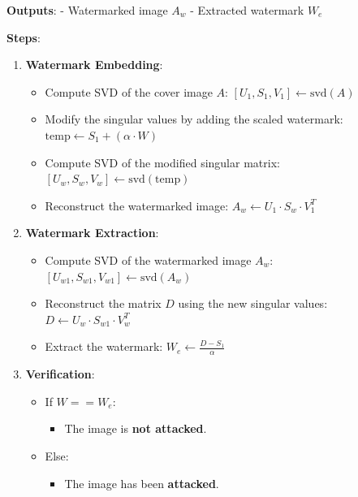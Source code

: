 \documentclass[
  journal,
]{IEEEtran}%
\providecommand{\tightlist}{%
  \setlength{\itemsep}{0pt}\setlength{\parskip}{0pt}}\usepackage{longtable,booktabs,array}
\begin{document}
\textbf{Outputs}: - Watermarked image \(A_w\) - Extracted watermark
\(W_e\)

\textbf{Steps}:

\begin{enumerate}
\def\labelenumi{\arabic{enumi}.}
\tightlist
\item
  \textbf{Watermark Embedding}:

  \begin{itemize}
  \tightlist
  \item
    Compute SVD of the cover image \(A\):
    \([U_1, S_1, V_1] \gets \text{svd}(A)\)
  \item
    Modify the singular values by adding the scaled watermark:
    \(\text{temp} \gets S_1 + (\alpha \cdot W)\)
  \item
    Compute SVD of the modified singular matrix:
    \([U_w, S_w, V_w] \gets \text{svd}(\text{temp})\)
  \item
    Reconstruct the watermarked image:
    \(A_w \gets U_1 \cdot S_w \cdot V_1^T\)
  \end{itemize}
\item
  \textbf{Watermark Extraction}:

  \begin{itemize}
  \tightlist
  \item
    Compute SVD of the watermarked image \(A_w\):
    \([U_{w1}, S_{w1}, V_{w1}] \gets \text{svd}(A_w)\)
  \item
    Reconstruct the matrix \(D\) using the new singular values:
    \(D \gets U_w \cdot S_{w1} \cdot V_w^T\)
  \item
    Extract the watermark: \(W_e \gets \frac{D - S_1}{\alpha}\)
  \end{itemize}
\item
  \textbf{Verification}:

  \begin{itemize}
  \tightlist
  \item
    If \(W == W_e\):

    \begin{itemize}
    \tightlist
    \item
      The image is \textbf{not attacked}.
    \end{itemize}
  \item
    Else:

    \begin{itemize}
    \tightlist
    \item
      The image has been \textbf{attacked}.
    \end{itemize}
  \end{itemize}
\end{enumerate}
\end{document}
